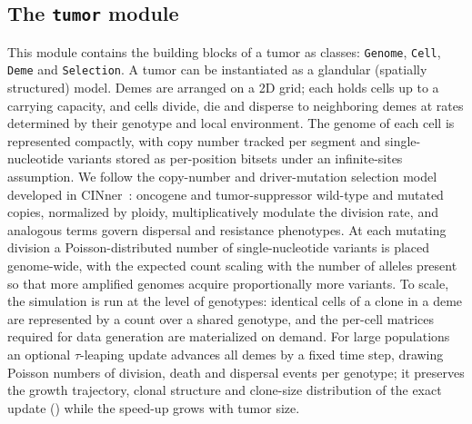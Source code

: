 \documentclass{article}
\begin{document}
\subsection{The \texttt{tumor} module}
\label{sec:methods_tumor}
This module contains the building blocks of a tumor as classes: \texttt{Genome},
\texttt{Cell}, \texttt{Deme} and \texttt{Selection}. A tumor can be instantiated as a glandular
(spatially structured) model. Demes are arranged on a 2D grid; each holds cells up to a
carrying capacity, and cells divide, die and disperse to neighboring demes at rates determined
by their genotype and local environment. The genome of each cell is represented compactly, with
copy number tracked per segment and single-nucleotide variants stored as per-position bitsets
under an infinite-sites assumption. We follow the copy-number and driver-mutation selection
model developed in CINner~\cite{dinh_cinner_2025}: oncogene and tumor-suppressor wild-type and
mutated copies, normalized by ploidy, multiplicatively modulate the division rate, and analogous
terms govern dispersal and resistance phenotypes. At each mutating division a
Poisson-distributed number of single-nucleotide variants is placed genome-wide, with the
expected count scaling with the number of alleles present so that more amplified genomes acquire
proportionally more variants. To scale, the simulation is run at the level of genotypes:
identical cells of a clone in a deme are represented by a count over a shared genotype, and the
per-cell matrices required for data generation are materialized on demand. For large
populations an optional $\tau$-leaping update advances all demes by a fixed time step, drawing
Poisson numbers of division, death and dispersal events per genotype; it preserves the growth
trajectory, clonal structure and clone-size distribution of the exact update
() while the speed-up grows with tumor size.
\end{document}
